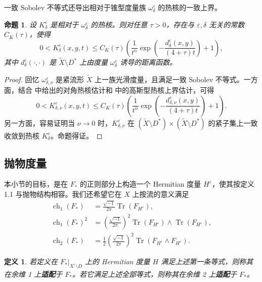 \documentclass[12pt,a4paper]{article}
\newtheorem{proposition}[theorem]{命题}
\newtheorem{definition}[theorem]{定义}
\newcommand{\ch}{\operatorname{ch}}
\newcommand{\Tr}{\operatorname{Tr}}
\begin{document}
一致 Sobolev 不等式还导出相对于锥型度量族 \(\omega^\varepsilon_\delta\) 的热核的一致上界。

\begin{proposition}
设 \(K^\varepsilon_\delta\) 是相对于 \(\omega^\varepsilon_\delta\) 的热核。则对任意 \(\tau>0\)，存在与 \(\varepsilon,\delta\) 无关的常数 \(C_K(\tau)\)，使得
\[
0<K^\varepsilon_\delta(x,y,t)\le
C_K(\tau)
\left(
\frac1{t^n}\exp\left(-\frac{d^\varepsilon_\delta(x,y)}{(4+\tau)t}\right)+1
\right),
\]
其中 \(d^\varepsilon_\delta(\cdot,\cdot)\) 是 \(\widetilde X\setminus D^*\) 上由度量 \(\omega^\varepsilon_\delta\) 诱导的距离函数。
\end{proposition}

\begin{proof}
回忆 \(\omega^\varepsilon_{\delta,\nu}\) 是紧流形 \(\widetilde X\) 上一族光滑度量，且满足一致 Sobolev 不等式。一方面，结合 \cite{ChengLi} 中给出的对角热核估计和 \cite[Theorem 1.1]{Grigoryan} 中的高斯型热核上界估计，可得
\[
0<K^\varepsilon_{\delta,\nu}(x,y,t)\le
C_K(\tau)
\left(
\frac1{t^n}\exp\left(-\frac{d^\varepsilon_{\delta,\nu}(x,y)}{(4+\tau)t}\right)+1
\right).
\]
另一方面，容易证明当 \(\nu\to 0\) 时，\(K^\varepsilon_{\delta,\nu}\) 在 \((\widetilde X\setminus D^*)\times (\widetilde X\setminus D^*)\) 的紧子集上一致收敛到热核 \(K^\varepsilon_\delta\)。命题得证。
\end{proof}

\subsection{抛物度量}

本小节的目标，是在 \(F_*\) 的正则部分上构造一个 Hermitian 度量 \(H^\varepsilon\)，使其按定义 1.1 与抛物结构相容。我们还希望它在 \(X\) 上按流的意义满足
\begin{align*}
\ch_1(F_*)&=\frac{\sqrt{-1}}{2\pi}\Tr(F_{H^\varepsilon}),\\
\ch_1(F_*)^2&=\left(\frac{\sqrt{-1}}{2\pi}\right)^2
\Tr(F_{H^\varepsilon})\wedge \Tr(F_{H^\varepsilon}),\\
\ch_2(F_*)&=\frac12\left(\frac{\sqrt{-1}}{2\pi}\right)^2
\Tr(F_{H^\varepsilon}\wedge F_{H^\varepsilon}).
\end{align*}

\begin{definition}
若定义在 \(F_*|_{X^\circ\setminus D}\) 上的 Hermitian 度量 \(H\) 满足上述第一条等式，则称其在余维 1 上\textbf{适配}于 \(F_*\)。若它满足上述全部等式，则称其在余维 2 上\textbf{适配}于 \(F_*\)。
\end{definition}
\end{document}
